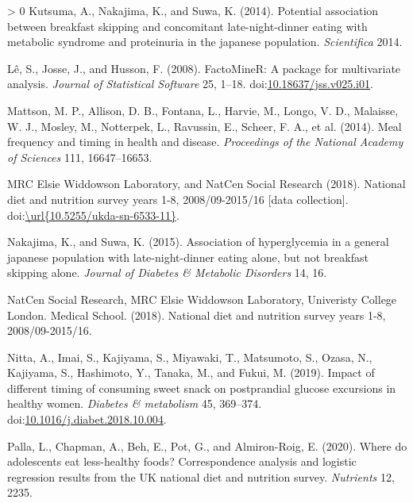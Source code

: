 \documentclass[utf8]{frontiersSCNS}
\newlength{\cslhangindent}
\newenvironment{CSLReferences}[3] %
 {%
  \setlength{\parindent}{0pt}
  \ifodd #1 \everypar{\setlength{\hangindent}{\cslhangindent}}\ignorespaces\fi
  \ifnum #2 > 0
  \setlength{\parskip}{#2\baselineskip}
  \fi
 }%
 {}
\begin{document}
\begin{CSLReferences}{1}{0}
\leavevmode\hypertarget{ref-kutsuma2014potential}{}%
Kutsuma, A., Nakajima, K., and Suwa, K. (2014). Potential association
between breakfast skipping and concomitant late-night-dinner eating with
metabolic syndrome and proteinuria in the japanese population.
\emph{Scientifica} 2014.

\leavevmode\hypertarget{ref-L__2008}{}%
Lê, S., Josse, J., and Husson, F. (2008). {FactoMineR}: A package for
multivariate analysis. \emph{Journal of Statistical Software} 25, 1--18.
doi:\href{https://doi.org/10.18637/jss.v025.i01}{10.18637/jss.v025.i01}.

\leavevmode\hypertarget{ref-mattson2014meal}{}%
Mattson, M. P., Allison, D. B., Fontana, L., Harvie, M., Longo, V. D.,
Malaisse, W. J., Mosley, M., Notterpek, L., Ravussin, E., Scheer, F. A.,
et al. (2014). Meal frequency and timing in health and disease.
\emph{Proceedings of the National Academy of Sciences} 111,
16647--16653.

\leavevmode\hypertarget{ref-MRCElsieWiddowsonLaboratory2018}{}%
MRC Elsie Widdowson Laboratory, and NatCen Social Research (2018).
National diet and nutrition survey years 1-8, 2008/09-2015/16 {[}data
collection{]}.
doi:\href{https://doi.org//url\%7B10.5255/ukda-sn-6533-11\%7D}{\textbackslash url\{10.5255/ukda-sn-6533-11\}}.

\leavevmode\hypertarget{ref-nakajima2015association}{}%
Nakajima, K., and Suwa, K. (2015). Association of hyperglycemia in a
general japanese population with late-night-dinner eating alone, but not
breakfast skipping alone. \emph{Journal of Diabetes \& Metabolic
Disorders} 14, 16.

\leavevmode\hypertarget{ref-NDNSdatabase2018}{}%
NatCen Social Research, MRC Elsie Widdowson Laboratory, Univeristy
College London. Medical School. (2018). National diet and nutrition
survey years 1-8, 2008/09-2015/16.

\leavevmode\hypertarget{ref-Nitta2019}{}%
Nitta, A., Imai, S., Kajiyama, S., Miyawaki, T., Matsumoto, S., Ozasa,
N., Kajiyama, S., Hashimoto, Y., Tanaka, M., and Fukui, M. (2019).
Impact of different timing of consuming sweet snack on postprandial
glucose excursions in healthy women. \emph{Diabetes \& metabolism} 45,
369--374.
doi:\href{https://doi.org/10.1016/j.diabet.2018.10.004}{10.1016/j.diabet.2018.10.004}.

\leavevmode\hypertarget{ref-palla2020adolescents}{}%
Palla, L., Chapman, A., Beh, E., Pot, G., and Almiron-Roig, E. (2020).
Where do adolescents eat less-healthy foods? Correspondence analysis and
logistic regression results from the UK national diet and nutrition
survey. \emph{Nutrients} 12, 2235.


\end{CSLReferences}
\end{document}
